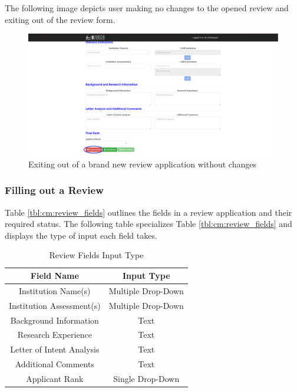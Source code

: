 \documentclass[fontsize=12pt,paper=letter,twoside]{scrartcl}
\begin{document}
\bigskip
\noindent The following image depicts user making no changes to the opened review and exiting out of the review form.

\begin{figure}[!htb]
\begin{center}
\includegraphics[width=.99\textwidth]{images/cm/new_review_exit_wo_changes.png}
\end{center}
\caption{Exiting out of a brand new review application without changes}
\label{fig:cm:new_review_exit_w/o_changes}
\end{figure}

\subsubsection{Filling out a Review}
Table \ref{tbl:cm:review_fields} outlines the fields in a review application and their required status. The following table specializes Table \ref{tbl:cm:review_fields} and displays the type of input each field takes.

\begin{table}[h]
\centering
\begin{tabular}{|c | c |}
	\cline{1-2}
	\textbf{Field Name} & \textbf{Input Type}\\ \hline
	Institution Name(s) & Multiple Drop-Down \\ \hline
	Institution Assessment(s) & Multiple Drop-Down \\ \hline
	Background Information & Text \\ \hline
	Research Experience & Text \\ \hline
	Letter of Intent Analysis & Text \\ \hline
	Additional Comments & Text \\ \hline
	Applicant Rank & Single Drop-Down \\ \hline
\end{tabular}
\caption {Review Fields Input Type}
\label{tbl:cm:review_fields_input}
\end{table}
\end{document}
